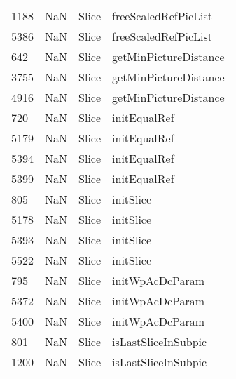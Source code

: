 \begin{tabular}{llll}
1188 &                   NaN &                      Slice &                      freeScaledRefPicList \\
5386 &                   NaN &                      Slice &                      freeScaledRefPicList \\
642  &                   NaN &                      Slice &                     getMinPictureDistance \\
3755 &                   NaN &                      Slice &                     getMinPictureDistance \\
4916 &                   NaN &                      Slice &                     getMinPictureDistance \\
720  &                   NaN &                      Slice &                              initEqualRef \\
5179 &                   NaN &                      Slice &                              initEqualRef \\
5394 &                   NaN &                      Slice &                              initEqualRef \\
5399 &                   NaN &                      Slice &                              initEqualRef \\
805  &                   NaN &                      Slice &                                 initSlice \\
5178 &                   NaN &                      Slice &                                 initSlice \\
5393 &                   NaN &                      Slice &                                 initSlice \\
5522 &                   NaN &                      Slice &                                 initSlice \\
795  &                   NaN &                      Slice &                           initWpAcDcParam \\
5372 &                   NaN &                      Slice &                           initWpAcDcParam \\
5400 &                   NaN &                      Slice &                           initWpAcDcParam \\
801  &                   NaN &                      Slice &                       isLastSliceInSubpic \\
1200 &                   NaN &                      Slice &                       isLastSliceInSubpic \\

\end{tabular}
